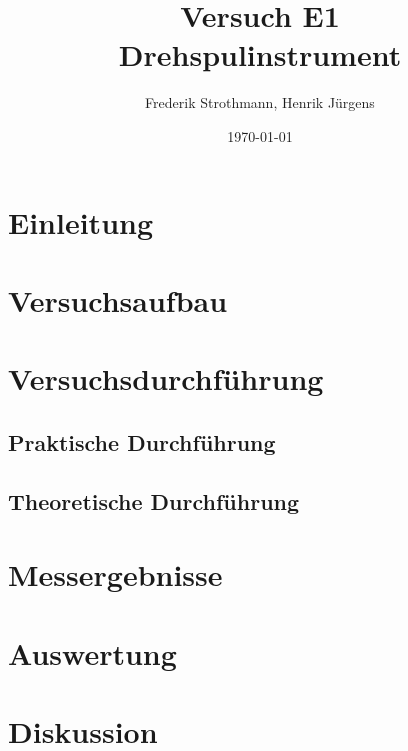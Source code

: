 \documentclass[12pt]{scrartcl}
\title{Versuch E1\\ Drehspulinstrument}
\author{Frederik Strothmann, Henrik Jürgens}
\date{\today}
\begin{document}

\maketitle



\section{Einleitung}



\section{Versuchsaufbau}


\section{Versuchsdurchführung}


\subsection{Praktische Durchführung}


\subsection{Theoretische Durchführung}


\section{Messergebnisse}



\section{Auswertung}


\section{Diskussion}


\end{document}
